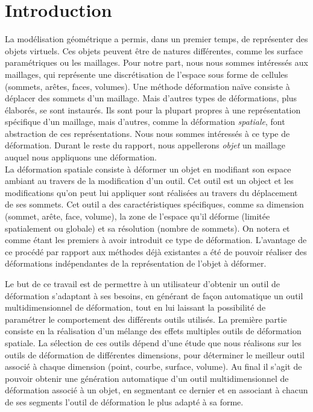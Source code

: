 
\chapter{Introduction}

\graphicspath{ {Introduction/IntroductionFigs/PNG/}
  {Introduction/IntroductionFigs/PDF/}
  {Introduction/IntroductionFigs/} }

La modélisation géométrique a permis, dans un premier temps, de représenter
des objets virtuels. Ces objets peuvent être de natures différentes, comme les
surface paramétriques ou les maillages. Pour notre part, nous nous sommes
intéressés aux maillages, qui représente une discrétisation de l'espace sous
forme de cellules (sommets, arêtes, faces, volumes). Une méthode déformation
naïve consiste à déplacer des sommets d'un maillage. Mais d'autres types de
déformations, plus élaborés, se sont instaurés. Ils sont pour la plupart
propres à une représentation spécifique d'un maillage, mais d'autres, comme la
déformation \textit{spatiale}, font abstraction de ces représentations. Nous
nous sommes intéressés à ce type de déformation. Durant le reste du rapport, nous
appellerons \textit{objet} un maillage auquel nous appliquons une déformation.\\
	
La déformation spatiale consiste à déformer un objet en modifiant son espace
ambiant au travers de la modification d'un outil. Cet outil est un object et
les modifications qu'on peut lui appliquer sont réalisées au travers du
déplacement de ses sommets. Cet outil a des caractéristiques spécifiques,
comme sa dimension (sommet, arête, face, volume), la zone de l'espace qu'il
déforme (limitée spatialement ou globale) et sa résolution (nombre de
sommets). On notera \cite{Bar84} et \cite{SP86} comme étant les premiers à
avoir introduit ce type de déformation. L'avantage de ce procédé par rapport
aux méthodes déjà existantes a été de pouvoir réaliser des déformations
indépendantes de la représentation de l'objet à déformer.

Le but de ce travail est de permettre à un utilisateur d'obtenir un
outil de déformation s'adaptant à ses besoins, en générant de façon
automatique un outil multidimensionnel de déformation, tout en lui
laissant la possibilité de paramétrer le comportement des différents
outils utilisés. La première partie consiste en la réalisation d'un
mélange des effets multiples outils de déformation spatiale. La
sélection de ces outils dépend d'une étude que nous réalisons sur les
outils de déformation de différentes dimensions, pour déterminer le
meilleur outil associé à chaque dimension (point, courbe, surface,
volume). Au final il s'agit de pouvoir obtenir une génération
automatique d'un outil multidimensionnel de déformation associé à un
objet, en segmentant ce dernier et en associant à chacun de ses
segments l'outil de déformation le plus adapté à sa forme.
\\

